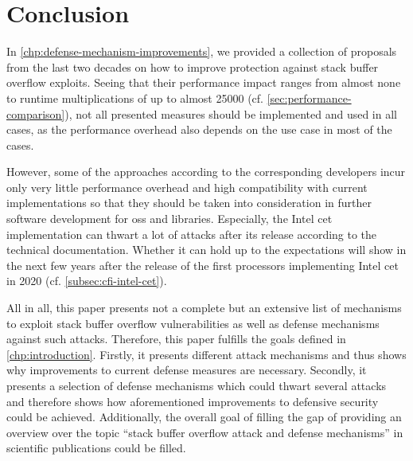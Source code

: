 \chapter{Conclusion}
\label{chp:conclusion}

In \cref{chp:defense-mechanism-improvements}, we provided a collection of proposals from the last two decades on how to improve protection against stack buffer overflow exploits.
Seeing that their performance impact ranges from almost none to runtime multiplications of up to almost 25000 (cf. \cref{sec:performance-comparison}), not all presented measures should be implemented and used in all cases, as the performance overhead also depends on the use case in most of the cases.

However, some of the approaches according to the corresponding developers incur only very little performance overhead and high compatibility with current implementations so that they should be taken into consideration in further software development for \glspl{os} and libraries.
Especially, the Intel \gls{cet} implementation can thwart a lot of attacks after its release according to the technical documentation.
Whether it can hold up to the expectations will show in the next few years after the release of the first processors implementing Intel \gls{cet} in 2020 (cf. \cref{subsec:cfi-intel-cet}).

All in all, this paper presents not a complete but an extensive list of mechanisms to exploit stack buffer overflow vulnerabilities as well as defense mechanisms against such attacks.
Therefore, this paper fulfills the goals defined in \cref{chp:introduction}.
Firstly, it presents different attack mechanisms and thus shows why improvements to current defense measures are necessary.
Secondly, it presents a selection of defense mechanisms which could thwart several attacks and therefore shows how aforementioned improvements to defensive security could be achieved.
Additionally, the overall goal of filling the gap of providing an overview over the topic ``stack buffer overflow attack and defense mechanisms'' in scientific publications could be filled.